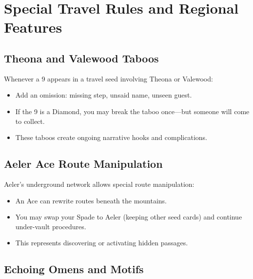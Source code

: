 \section{Special Travel Rules and Regional Features}
\label{sec:special-rules}

\subsection{Theona and Valewood Taboos}
\label{subsec:theona-taboos}

Whenever a 9 appears in a travel seed involving Theona or Valewood:
\begin{itemize}
\item Add an omission: missing step, unsaid name, unseen guest.
\item If the 9 is a Diamond, you may break the taboo once—but someone will come to collect.
\item These taboos create ongoing narrative hooks and complications.
\end{itemize}

\subsection{Aeler Ace Route Manipulation}
\label{subsec:aeler-aces}

Aeler's underground network allows special route manipulation:
\begin{itemize}
\item An Ace can rewrite routes beneath the mountains.
\item You may swap your Spade to Aeler (keeping other seed cards) and continue under-vault procedures.
\item This represents discovering or activating hidden passages.
\end{itemize}

\subsection{Echoing Omens and Motifs}
\label{subsec:echoing-omens}

